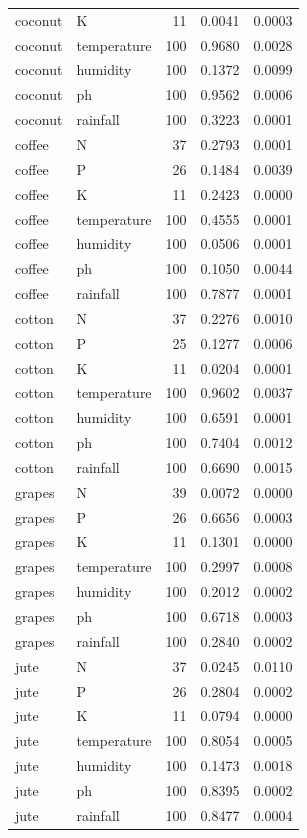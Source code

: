 \begin{tabular}{llrrr}
coconut & K & 11 & 0.0041 & 0.0003 \\
coconut & temperature & 100 & 0.9680 & 0.0028 \\
coconut & humidity & 100 & 0.1372 & 0.0099 \\
coconut & ph & 100 & 0.9562 & 0.0006 \\
coconut & rainfall & 100 & 0.3223 & 0.0001 \\
coffee & N & 37 & 0.2793 & 0.0001 \\
coffee & P & 26 & 0.1484 & 0.0039 \\
coffee & K & 11 & 0.2423 & 0.0000 \\
coffee & temperature & 100 & 0.4555 & 0.0001 \\
coffee & humidity & 100 & 0.0506 & 0.0001 \\
coffee & ph & 100 & 0.1050 & 0.0044 \\
coffee & rainfall & 100 & 0.7877 & 0.0001 \\
cotton & N & 37 & 0.2276 & 0.0010 \\
cotton & P & 25 & 0.1277 & 0.0006 \\
cotton & K & 11 & 0.0204 & 0.0001 \\
cotton & temperature & 100 & 0.9602 & 0.0037 \\
cotton & humidity & 100 & 0.6591 & 0.0001 \\
cotton & ph & 100 & 0.7404 & 0.0012 \\
cotton & rainfall & 100 & 0.6690 & 0.0015 \\
grapes & N & 39 & 0.0072 & 0.0000 \\
grapes & P & 26 & 0.6656 & 0.0003 \\
grapes & K & 11 & 0.1301 & 0.0000 \\
grapes & temperature & 100 & 0.2997 & 0.0008 \\
grapes & humidity & 100 & 0.2012 & 0.0002 \\
grapes & ph & 100 & 0.6718 & 0.0003 \\
grapes & rainfall & 100 & 0.2840 & 0.0002 \\
jute & N & 37 & 0.0245 & 0.0110 \\
jute & P & 26 & 0.2804 & 0.0002 \\
jute & K & 11 & 0.0794 & 0.0000 \\
jute & temperature & 100 & 0.8054 & 0.0005 \\
jute & humidity & 100 & 0.1473 & 0.0018 \\
jute & ph & 100 & 0.8395 & 0.0002 \\
jute & rainfall & 100 & 0.8477 & 0.0004 \\

\end{tabular}
